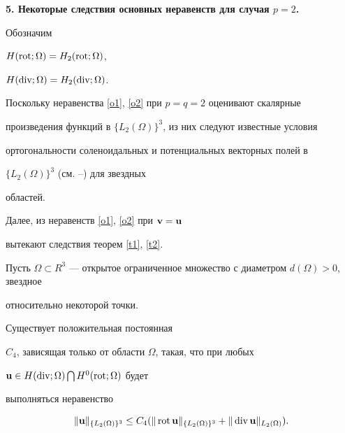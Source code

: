 \addtocounter{section}{1}


\setcounter{equation}{0}


\setcounter{thms}{0}


\setcounter{lems}{0}


\medskip





{\bf 5. Некоторые следствия основных неравенств для случая $p=2$.}


Обозначим


$H(\operatorname{rot};\Omega)=H_2(\operatorname{rot};\Omega)$,


$H(\operatorname{div};\Omega)=H_2(\operatorname{div};\Omega)$.





Поскольку неравенства \eqref{o1}, \eqref{o2} при $p=q=2$ оценивают скалярные


произведения функций в $\{L_2(\Omega)\}^3$, из них следуют известные условия


ортогональности соленоидальных и потенциальных векторных полей в


$\{L_2(\Omega)\}^3$ (см. \cite{1}--\cite{8}) для звездных


областей.





Далее, из неравенств \eqref{o1}, \eqref{o2} при $\bold{v}=\bold{u}$


вытекают следствия теорем \ref{t1}, \ref{t2}.


Пусть $\Omega\subset


R^3$ --- открытое ограниченное множество с диаметром $d(\Omega)>0$, звездное


относительно некоторой точки. 





\begin{thms}\label{t6}


Существует положительная постоянная


$C_4$, зависящая только от области $\Omega$, такая, что при любых


$\bold{u}\in H(\operatorname{div};\Omega)\bigcap H^0(\operatorname{rot};\Omega)$ будет


выполняться неравенство


$$


\|\bold{u}\|_{\{L_2(\Omega)\}^3}\leq C_4(\|


\Rot\bold{u}\|_{\{L_2(\Omega)\}^3}+\|\Div \bold{u}\|_{L_2(\Omega)}).


$$


\end{thms}






